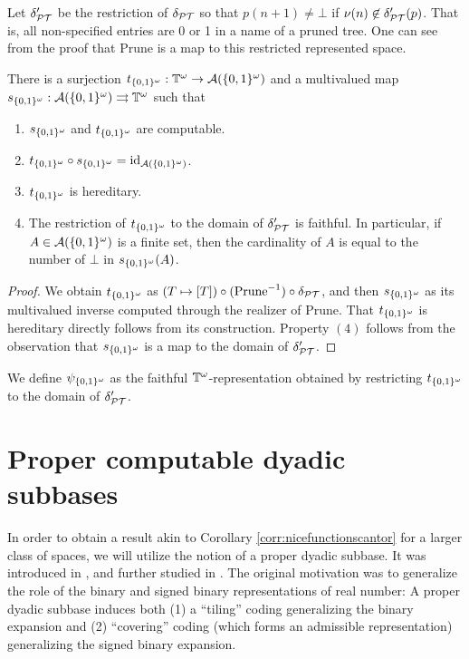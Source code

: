 \documentclass{eptcs-modified}
\begin{document}
Let $\delta'_{\mathcal{PT}}$ be the restriction of $\delta_{\mathcal{PT}}$ so that
$p(n+1) \ne \bot $ if $\nu(n) \not \in \delta'_{\mathcal{PT}}(p)$.  That is,
all non-specified entries are 0 or 1 in a name of a pruned tree.
One can see from the proof that $\textrm{Prune}$ is a map to this restricted represented space.

\begin{corollary}
\label{corr:nicefunctionscantor}
There is a surjection $t_{{\{0,1\}^\omega}}: \mathbb{T}^\omega \to {\mathcal{A}}({\{0,1\}^\omega})$ and a multivalued
map $s_{{\{0,1\}^\omega}}: {\mathcal{A}}({\{0,1\}^\omega}) \rightrightarrows \mathbb{T}^\omega$ such that
\begin{enumerate}
\item $s_{{\{0,1\}^\omega}}$ and $t_{{\{0,1\}^\omega}}$ are computable.
\item $t_{{\{0,1\}^\omega}} \circ s_{{\{0,1\}^\omega}} = \textnormal{id}_{\mathcal{A}({\{0,1\}^\omega})}$.
\item $t_{{\{0,1\}^\omega}}$ is hereditary.
\item The restriction of $t_{\{0,1\}^\omega}$ to the domain of $\delta'_{\mathcal{PT}}$ is faithful. In particular, if $A \in {\mathcal{A}}({\{0,1\}^\omega})$ is a finite set, then
the cardinality of $A$ is equal to the number of $\bot$ in $s_{{\{0,1\}^\omega}}(A)$.
\end{enumerate}
\begin{proof}
We obtain $t_{{\{0,1\}^\omega}}$ as $(T \mapsto [T]) \circ (\textrm{Prune}^{-1}) \circ \delta_{\mathcal{PT}}$, and then $s_{{\{0,1\}^\omega}}$ as its multivalued inverse
computed through the realizer of $\textrm{Prune}$.
That $t_{{\{0,1\}^\omega}}$ is hereditary directly follows from its construction.
Property $(4)$ follows from the observation that  $s_{{\{0,1\}^\omega}}$ is a map to
the domain of $\delta'_{\mathcal{PT}}$.
\end{proof}
\end{corollary}

We define $\psi_{\{0,1\}^\omega}$ as the faithful $\mathbb{T}^\omega$-representation
obtained by restricting  $t_{\{0,1\}^\omega}$ to the domain of $\delta'_{\mathcal{PT}}$.


\section{Proper computable dyadic subbases}
\label{sec:propersubbases}

In order to obtain a result akin to  Corollary \ref{corr:nicefunctionscantor} for a larger class of spaces, we will utilize the notion of a proper dyadic subbase.  It was introduced in \cite{tsuiki},
and further studied in \cite{tsuiki2,tsuiki4,TsukamotoTsuiki:2016,tsukamotophd}.
The original motivation was to generalize the role of the binary and signed binary representations of real number: A proper dyadic subbase induces both (1) a ``tiling'' coding generalizing the binary expansion and (2) ``covering'' coding (which forms an admissible representation) generalizing the signed binary expansion.
\end{document}
